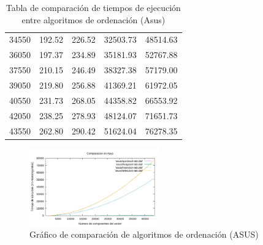 \documentclass{homework}
\begin{document}
\begin{table}[H]
\begin{tabular}{|r|r|r|r|r|}
            34550 & 192.52 & 226.52 & 32503.73 & 48514.63 \\ 
            36050 & 197.37 & 234.89 & 35181.93 & 52767.88 \\ 
            37550 & 210.15 & 246.49 & 38327.38 & 57179.00 \\ 
            39050 & 219.80 & 256.88 & 41369.21 & 61972.05 \\ 
            40550 & 231.73 & 268.05 & 44358.82 & 66553.92 \\ 
            42050 & 238.25 & 278.93 & 48124.07 & 71651.73 \\ 
            43550 & 262.80 & 290.42 & 51624.04 & 76278.35 \\ 
            \hline
        \end{tabular}
        \caption{Tabla de comparación de tiempos de ejecución entre algoritmos de ordenación (Asus)}
    \end{table}

    \begin{figure}[H]
        \centering
        \label{asus:orden}
        \includegraphics[width=0.5\textwidth]{../data/asus-orden-todos.pdf}
        \caption{Gráfico de comparación de algoritmos de ordenación (ASUS)}
    \end{figure}
\end{document}
